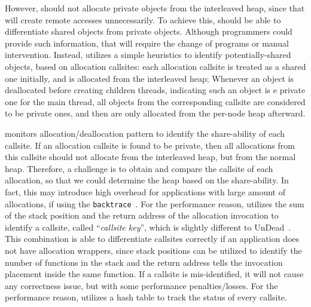 However, \NA{} should not allocate private objects from the interleaved heap, since that will create remote accesses unnecessarily. To achieve this, \NM{} should be able to differentiate shared objects from private objects. Although programmers could provide such information, that will require the change of programs or manual intervention. Instead, \NM{} utilizes a simple heuristics to identify potentially-shared objects, based on allocation callsites: each allocation callsite is treated as a shared one initially, and is allocated from the interleaved heap; Whenever an object is deallocated before creating children threads, indicating such an object is e private one for the main thread,  all objects from the corresponding callsite are considered to be private ones, and then are only allocated from the per-node heap afterward. 

\NM{} monitors allocation/deallocation pattern to identify the share-ability of each callsite. If an allocation callsite is found to be private, then all allocations from this callsite should not allocate from the interleaved heap, but from the normal heap. Therefore, a challenge  is to obtain and compare the callsite of each allocation, so that we could determine the heap based on the share-ability. In fact, this may introduce high overhead for applications with large amount of allocations, if using the \texttt{backtrace}~\cite{DBLP:conf/icse/SumnerZWZ10, DBLP:conf/cgo/ZengR0AJ014}. For the performance reason, \NA{} utilizes the sum of the stack position and the return address of the allocation invocation to identify a callsite, called ``\textit{callsite key}'',  which is slightly different to UnDead~\cite{UnDead}. This combination is able to differentiate callsites correctly if an application does not have allocation wrappers, since stack positions can be utilized to identify the number of functions in the stack and the return address tells the invocation placement inside the same function. If a callsite is mis-identified, it will not cause any correctness issue, but with some performance penalties/losses. For the performance reason, \NA{} utilizes a hash table to track the status of every callsite. 
 
